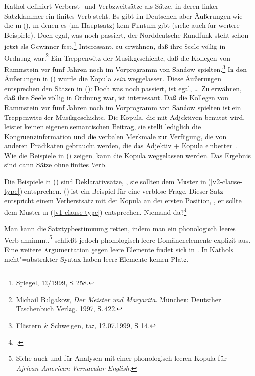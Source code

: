 Kathol definiert Verberst- und Verbzweitsätze als Sätze, in deren linker Satzklammer
ein finites Verb steht. Es gibt im Deutschen aber Äußerungen wie die in (),
in denen es (im Hauptsatz) kein Finitum gibt (siehe auch  für weitere
Beispiele).
\eal
\ex Doch egal,      was  noch  passiert, der Norddeutsche Rundfunk             steht  schon   jetzt als Gewinner fest.\footnote{
        Spiegel, 12/1999, S.\,258.
}
\ex Interessant, zu erwähnen, daß ihre Seele völlig    in Ordnung war.\footnote{
        Michail Bulgakow, \emph{Der Meister und Margarita}. München: Deutscher Taschenbuch Verlag. 1997, S.\,422.
      }
\ex Ein Treppenwitz der    Musikgeschichte, daß die Kollegen   von Rammstein vor    fünf Jahren noch im      Vorprogramm   von Sandow spielten.\footnote{
        Flüstern \& Schweigen, taz, 12.07.1999, S.\,14. %
}
\zl
In den Äußerungen in () wurde die Kopula \emph{sein} weggelassen.
Diese Äußerungen entsprechen den Sätzen in ():
\eal
\ex Doch was noch passiert, ist egal, \ldots
\ex Zu erwähnen, daß ihre Seele völlig in Ordnung war, ist interessant.
\ex Daß die Kollegen von Rammstein vor fünf Jahren noch im Vorprogramm von Sandow spielten ist ein Treppenwitz der Musikgeschichte.
\zl
Die Kopula, die mit Adjektiven benutzt wird, leistet keinen eigenen semantischen Beitrag,
sie stellt lediglich die Kongruenzinformation und die verbalen Merkmale zur Verfügung, die von anderen Prädikaten
gebraucht werden, die das Adjektiv + Kopula einbetten \citep[]{Paul1919a}.
Wie die Beispiele in () zeigen, kann die Kopula weggelassen werden. Das Ergebnis sind dann
Sätze ohne finites Verb.

Die Beispiele in () sind Deklarativsätze, \dash, sie sollten dem Muster in
(\ref{v2-clause-type}) entsprechen. () ist ein Beispiel für eine verblose Frage.
Dieser Satz entspricht einem Verberstsatz mit der Kopula an der ersten Position,
\dash, er sollte dem Muster in (\ref{v1-clause-type}) entsprechen.
\ea
Niemand da?\footnote{
        .
}
\z

\noindent
Man kann die Satztypbestimmung retten, indem man ein phonologisch leeres Verb annimmt.\footnote{
  Siehe auch  und  für Analysen
  mit einer phonologisch leeren Kopula für \emph{African American Vernacular English}.%
}
 schließt jedoch phonologisch leere Domänenelemente explizit aus.
Eine weitere Argumentation gegen leere Elemente findet sich in .
In Kathols nicht"=abstrakter Syntax haben leere Elemente keinen Platz.

